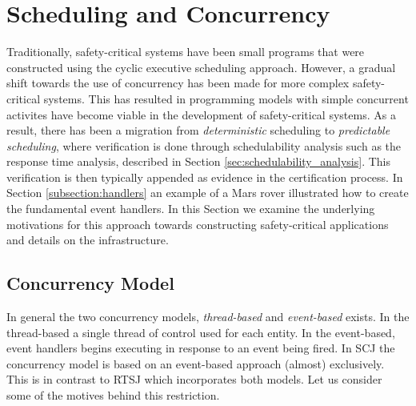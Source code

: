 \section{Scheduling and Concurrency}
\label{section:schedulingConcurrency}
Traditionally, safety-critical systems have been small programs that were constructed using the cyclic executive scheduling approach. However, a gradual shift towards the use of concurrency has been made for more complex safety-critical systems. This has resulted in programming models with simple concurrent activites have become viable in the development of safety-critical systems. As a result, there has been a migration from \textit{deterministic} scheduling to \textit{predictable scheduling}, where verification is done through schedulability analysis such as the response time analysis, described in Section \ref{sec:schedulability_analysis}. This verification is then typically appended as evidence in the certification process. In Section \ref{subsection:handlers} an example of a Mars rover illustrated how to create the fundamental event handlers. In this Section we examine the underlying motivations for this approach towards constructing safety-critical applications and details on the infrastructure.



\subsection{Concurrency Model} %
\label{sub:concurrency_model}
In general the two concurrency models, \textit{thread-based} and \textit{event-based} exists. In the thread-based a single thread of control used for each entity. In the event-based, event handlers begins executing in response to an event being fired. In SCJ the concurrency model is based on an event-based approach (almost) exclusively. This is in contrast to RTSJ which incorporates both models. Let us consider some of the motives behind this restriction. 

